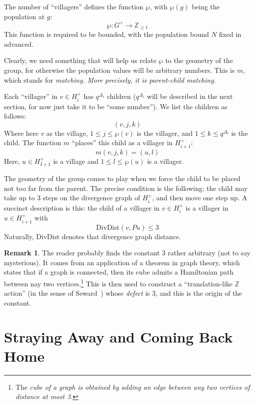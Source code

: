 \documentclass[12pt,reqno]{amsart}
\theoremstyle{plain}
\theoremstyle{definition}
\numberwithin{subcase}{case}
\theoremstyle{plain}
\theoremstyle{definition}
\newtheorem{remark}[thm]{Remark}
\begin{document}
The number of ``villagers'' defines the function \(\wp\), with \(\wp(g)\) being the population at \(g\):
\[
\wp: G^{+} \to \mathbb{Z}_{\geq 1}
\]
This function is required to be bounded, with the population bound \(N\) fixed in advanced.

Clearly, we need something that will help us relate \(\wp\) to the geometry of the group, for otherwise the population values will be arbitrary numbers. This is \(m\), which stands for \em matching\em. More precisely, it is \em parent-child matching\em. 

Each ``villager'' in \(v \in H^{+}_{i}\) has \(q^{\Delta_{i}}\) children (\(q^{\Delta_{i}}\) will be described in the next section, for now just take it to be ``some number''). We list the children as follows: 
\[
(v,j,k)
\]
Where here \(v\) as the village, \(1 \leq j \leq \wp(v)\) is the villager, and \(1 \leq k \leq q^{\Delta_{i}}\) is the child. The function \(m\) ``places'' this child as a villager in \(H^{+}_{i+1}\):
\[
m(v,j,k) = (u,l)
\]
Here, \(u \in H^{+}_{I+1}\) is a village and \(1 \leq l \leq \wp(u)\) is a villager.

The geometry of the group comes to play when we force the child to be placed not too far from the parent.  The precise condition is the following: the child may take up to 3 steps on the divergence graph of \(H^{+}_{i}\), and then move one step up. A succinct description is this: the child of a villager in \(v \in H^{+}_{i}\) is a villager in \(u  \in H^{+}_{i+1}\) with 
\[
\mathrm{DivDist}(v,Pu) \leq 3
\]
Naturally, \(\mathrm{DivDist}\) denotes that divergence graph distance. 

\begin{remark}
The reader probably finds the constant 3 rather arbitrary (not to say mysterious). It comes from an application of a theorem in graph theory, which states that if a graph is connected, then its cube 
admits a Hamiltonian path between nay two vertices.\footnote{The \em cube \em of a graph is obtained by adding an edge between any two vertices of distance at most 3.} 
This is then used to construct a ``translation-like \(\mathbb{Z}\) action'' (in the sense of Seward~\cite{MR3158775}) whose {\it defect}  is 3, and this is the origin of the constant. 
\end{remark}


\section{Straying Away and Coming Back Home}
\end{document}
